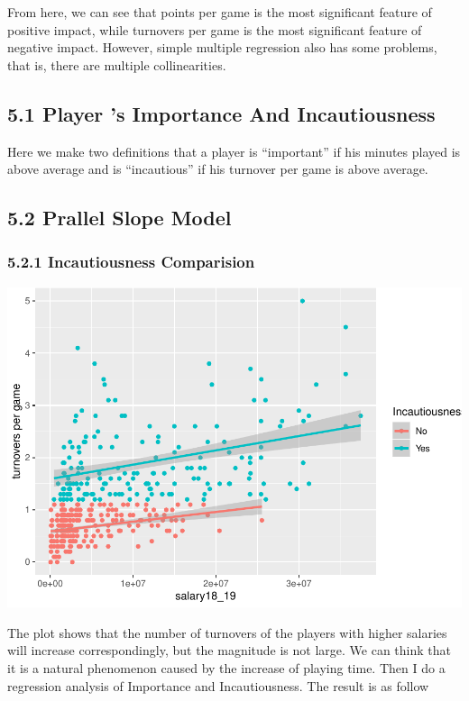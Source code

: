 \documentclass[]{article}
\begin{document}
From here, we can see that points per game is the most significant
feature of positive impact, while turnovers per game is the most
significant feature of negative impact. However, simple multiple
regression also has some problems, that is, there are multiple
collinearities.

\subsection{5.1 Player 's Importance And
Incautiousness}\label{player-s-importance-and-incautiousness}

Here we make two definitions that a player is ``important'' if his
minutes played is above average and is ``incautious'' if his turnover
per game is above average.

\subsection{5.2 Prallel Slope Model}\label{prallel-slope-model}

\subsubsection{5.2.1 Incautiousness
Comparision}\label{incautiousness-comparision}

\includegraphics{Final_Report_files/figure-latex/unnamed-chunk-17-1.pdf}

The plot shows that the number of turnovers of the players with higher
salaries will increase correspondingly, but the magnitude is not large.
We can think that it is a natural phenomenon caused by the increase of
playing time. Then I do a regression analysis of Importance and
Incautiousness. The result is as follow
\end{document}
